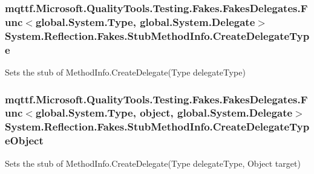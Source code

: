 \hypertarget{class_system_1_1_reflection_1_1_fakes_1_1_stub_method_info_a87bcea29fb3d02ba6893154792eac71f}{
\subsubsection[{Create\-Delegate\-Type}]{\setlength{\rightskip}{0pt plus 5cm}mqttf.\-Microsoft.\-Quality\-Tools.\-Testing.\-Fakes.\-Fakes\-Delegates.\-Func$<$global.\-System.\-Type, global.\-System.\-Delegate$>$ System.\-Reflection.\-Fakes.\-Stub\-Method\-Info.\-Create\-Delegate\-Type}}\label{class_system_1_1_reflection_1_1_fakes_1_1_stub_method_info_a87bcea29fb3d02ba6893154792eac71f}


Sets the stub of Method\-Info.\-Create\-Delegate(\-Type delegate\-Type)

\hypertarget{class_system_1_1_reflection_1_1_fakes_1_1_stub_method_info_af380bf7f1e98acd7c9b009310c02f58d}{
\subsubsection[{Create\-Delegate\-Type\-Object}]{\setlength{\rightskip}{0pt plus 5cm}mqttf.\-Microsoft.\-Quality\-Tools.\-Testing.\-Fakes.\-Fakes\-Delegates.\-Func$<$global.\-System.\-Type, object, global.\-System.\-Delegate$>$ System.\-Reflection.\-Fakes.\-Stub\-Method\-Info.\-Create\-Delegate\-Type\-Object}}\label{class_system_1_1_reflection_1_1_fakes_1_1_stub_method_info_af380bf7f1e98acd7c9b009310c02f58d}


Sets the stub of Method\-Info.\-Create\-Delegate(\-Type delegate\-Type, Object target)

